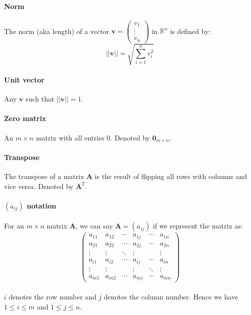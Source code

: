\documentclass{scrartcl}
\newcommand{\R}{\mathbb{R}}
\renewcommand{\vec}[1]{\mathbf{#1}}
\begin{document}
\paragraph{Norm}
The norm (aka length) of a vector $ \vec{v} = \begin{pmatrix}
v_{1} \\ \vdots \\ v_{n}
\end{pmatrix} $ in $ \R^{n} $ is defined by:
\begin{equation}
||\vec{v}|| = \sqrt{\sum_{i=1}^{n} v_{i}^{2}}
\end{equation}

\paragraph{Unit vector}
Any $ \vec{v} $ such that $ ||\vec{v}|| = 1 $.

\paragraph{Zero matrix}
An $ m \times n $ matrix with all entries 0. Denoted by $ \vec{0}_{m \times n} $.

\paragraph{Transpose}
The transpose of a matrix $ \vec{A} $ is the result of flipping all rows with columns and vice versa. Denoted by $ \vec{A}^{T} $.

\paragraph{$ (a_{ij}) $ notation}
For an $ m \times n $ matrix $ \vec{A} $, we can say $ \vec{A} = (a_{ij}) $ if we represent the matrix as:
\begin{equation}
\begin{pmatrix}
a_{11} & a_{12} & \cdots & a_{1j} & \cdots & a_{1n} \\
a_{21} & a_{22} & \cdots & a_{2j} & \cdots & a_{2n} \\
\vdots & \vdots & \ddots & \vdots &        & \vdots \\
a_{i1} & a_{i2} & \cdots & a_{ij} & \cdots & a_{in} \\
\vdots & \vdots &        & \vdots & \ddots & \vdots \\
a_{m1} & a_{m2} & \cdots & a_{mj} & \cdots & a_{mn}
\end{pmatrix}
\end{equation}
\\
$ i $ denotes the row number and $ j $ denotes the column number. Hence we have $ 1 \leq i \leq m $ and $ 1 \leq j \leq n $.
\end{document}
